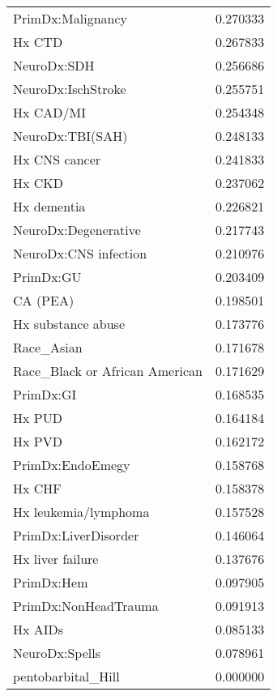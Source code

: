 \begin{tabular}{lr}
PrimDx:Malignancy              &   0.270333 \\
Hx CTD                         &   0.267833 \\
NeuroDx:SDH                    &   0.256686 \\
NeuroDx:IschStroke             &   0.255751 \\
Hx CAD/MI                      &   0.254348 \\
NeuroDx:TBI(SAH)               &   0.248133 \\
Hx CNS cancer                  &   0.241833 \\
Hx CKD                         &   0.237062 \\
Hx dementia                    &   0.226821 \\
NeuroDx:Degenerative           &   0.217743 \\
NeuroDx:CNS infection          &   0.210976 \\
PrimDx:GU                      &   0.203409 \\
CA (PEA)                       &   0.198501 \\
Hx substance abuse             &   0.173776 \\
Race\_Asian                     &   0.171678 \\
Race\_Black or African American &   0.171629 \\
PrimDx:GI                      &   0.168535 \\
Hx PUD                         &   0.164184 \\
Hx PVD                         &   0.162172 \\
PrimDx:EndoEmegy               &   0.158768 \\
Hx CHF                         &   0.158378 \\
Hx leukemia/lymphoma           &   0.157528 \\
PrimDx:LiverDisorder           &   0.146064 \\
Hx liver failure               &   0.137676 \\
PrimDx:Hem                     &   0.097905 \\
PrimDx:NonHeadTrauma           &   0.091913 \\
Hx AIDs                        &   0.085133 \\
NeuroDx:Spells                 &   0.078961 \\
pentobarbital\_Hill             &   0.000000 \\
\bottomrule
\end{tabular}
